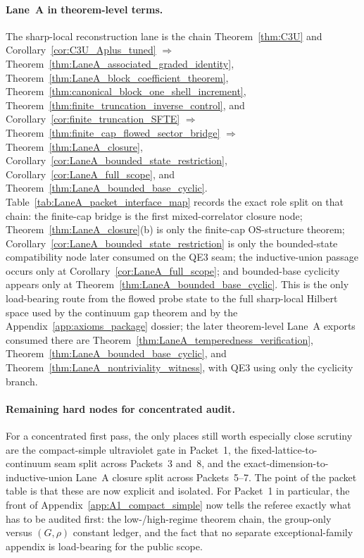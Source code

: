 \paragraph{Lane~A in theorem-level terms.}
The sharp-local reconstruction lane is the chain Theorem~\ref{thm:C3U} and Corollary~\ref{cor:C3U_Aplus_tuned} $\Longrightarrow$ Theorem~\ref{thm:LaneA_associated_graded_identity}, Theorem~\ref{thm:LaneA_block_coefficient_theorem}, Theorem~\ref{thm:canonical_block_one_shell_increment}, Theorem~\ref{thm:finite_truncation_inverse_control}, and Corollary~\ref{cor:finite_truncation_SFTE} $\Longrightarrow$ Theorem~\ref{thm:finite_cap_flowed_sector_bridge} $\Longrightarrow$ Theorem~\ref{thm:LaneA_closure}, Corollary~\ref{cor:LaneA_bounded_state_restriction}, Corollary~\ref{cor:LaneA_full_scope}, and Theorem~\ref{thm:LaneA_bounded_base_cyclic}.
Table~\ref{tab:LaneA_packet_interface_map} records the exact role split on that chain: the finite-cap bridge is the first mixed-correlator closure node; Theorem~\ref{thm:LaneA_closure}(b) is only the finite-cap OS-structure theorem; Corollary~\ref{cor:LaneA_bounded_state_restriction} is only the bounded-state compatibility node later consumed on the QE3 seam; the inductive-union passage occurs only at Corollary~\ref{cor:LaneA_full_scope}; and bounded-base cyclicity appears only at Theorem~\ref{thm:LaneA_bounded_base_cyclic}.
This is the only load-bearing route from the flowed probe state to the full sharp-local Hilbert space used by the continuum gap theorem and by the Appendix~\ref{app:axioms_package} dossier; the later theorem-level Lane~A exports consumed there are Theorem~\ref{thm:LaneA_temperedness_verification}, Theorem~\ref{thm:LaneA_bounded_base_cyclic}, and Theorem~\ref{thm:LaneA_nontriviality_witness}, with QE3 using only the cyclicity branch.

\paragraph{Remaining hard nodes for concentrated audit.}
For a concentrated first pass, the only places still worth especially close scrutiny are the compact-simple ultraviolet gate in Packet~1, the fixed-lattice-to-continuum seam split across Packets~3 and~8, and the exact-dimension-to-inductive-union Lane~A closure split across Packets~5--7.
The point of the packet table is that these are now explicit and isolated.
For Packet~1 in particular, the front of Appendix~\ref{app:A1_compact_simple} now tells the referee exactly what has to be audited first: the low-/high-regime theorem chain, the group-only versus $(G,\rho)$ constant ledger, and the fact that no separate exceptional-family appendix is load-bearing for the public scope.

